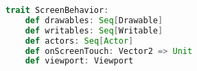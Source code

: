 \begin{lstlisting}[language=Scala, label=code:screen-behavior, caption=trait ScreenBehavior]
  trait ScreenBehavior:
    def drawables: Seq[Drawable]
    def writables: Seq[Writable]
    def actors: Seq[Actor]
    def onScreenTouch: Vector2 => Unit
    def viewport: Viewport
\end{lstlisting}